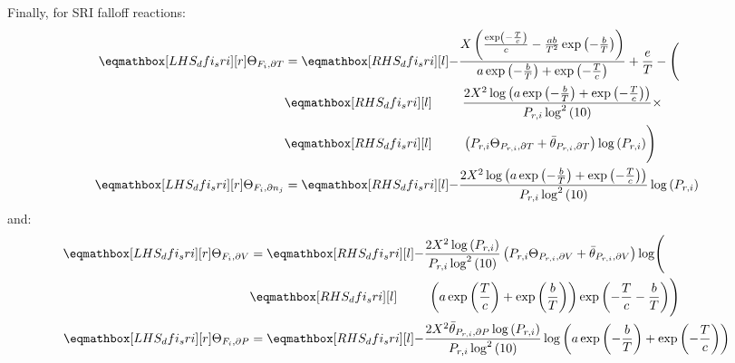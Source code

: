 \documentclass[12pt]{article}
\begin{document}
Finally, for SRI falloff reactions:
\begin{align}
 \label{e:dfi_sri_dt_prod}
 \lhs{dfi_sri}{\Theta_{F_i, \partial T}} &= 
 \rhs{dfi_sri}{- \frac{X \left(\frac{\operatorname{exp}\left({- \frac{T}{c}}\right)}{c} - \frac{a b}{T^{2}} \operatorname{exp}\left({- \frac{b}{T}}\right)\right)}{a \operatorname{exp}\left({- \frac{b}{T}}\right) + \operatorname{exp}\left({- \frac{T}{c}}\right)} + \frac{e}{T} - \Biggl(} \nonumber \\
 &\rhs{dfi_sri}{\mathindent \frac{2 X^{2} \log{\left (a \operatorname{exp}\left({- \frac{b}{T}}\right) + \operatorname{exp}\left({- \frac{T}{c}}\right) \right )}}{P_{r, i} \log^{2}{\left (10 \right )}} \times } \nonumber \\
 &\rhs{dfi_sri}{\mathindent \left(P_{r, i} \Theta_{P_{r,i}, \partial T} + \bar{\theta}_{P_{r, i}, \partial T}\right) \log{\left (P_{r, i} \right ) \Biggr)}} \\
 \label{e:dfi_sri_dnj_prod}
 \lhs{dfi_sri}{\Theta_{F_i, \partial n_j}} &= \rhs{dfi_sri}{- \frac{2 X^{2} \log{\left (a \operatorname{exp}\left({- \frac{b}{T}}\right) + \operatorname{exp}\left({- \frac{T}{c}}\right) \right )}}{P_{r, i} \log^{2}{\left (10 \right )}} \log{\left (P_{r, i} \right )}}
\end{align}
and:
\begin{subequations}
 \label{e:dfi_sri_de_prod}
 \begin{align}
  \lhs{dfi_sri}{\Theta_{F_i, \partial V}} &=
  \rhs{dfi_sri}{- \frac{2 X^{2} \log{\left (P_{r, i} \right )}}{P_{r, i} \log^{2}{\left (10 \right )}} \left(P_{r, i} \Theta_{P_{r,i}, \partial V} + \bar{\theta}_{P_{r, i}, \partial V}\right) \log \Biggl(} \nonumber \\
& \rhs{dfi_sri}{\mathindent \left( a \operatorname{exp}\left({\frac{T}{c}}\right) + \operatorname{exp}\left({\frac{b}{T}}\right)\right) \operatorname{exp}\left({- \frac{T}{c} - \frac{b}{T}}\right) \Biggr)} \\
  \lhs{dfi_sri}{\Theta_{F_i, \partial P}} &=
  \rhs{dfi_sri}{- \frac{2 X^{2} \bar{\theta}_{P_{r, i}, \partial P} \log{\left (P_{r, i} \right )}}{P_{r, i} \log^{2}{\left (10 \right )}} \log{\left (a \operatorname{exp}\left({- \frac{b}{T}}\right) + \operatorname{exp}\left({- \frac{T}{c}}\right) \right )}}
 \end{align}
\end{subequations}
\end{document}
